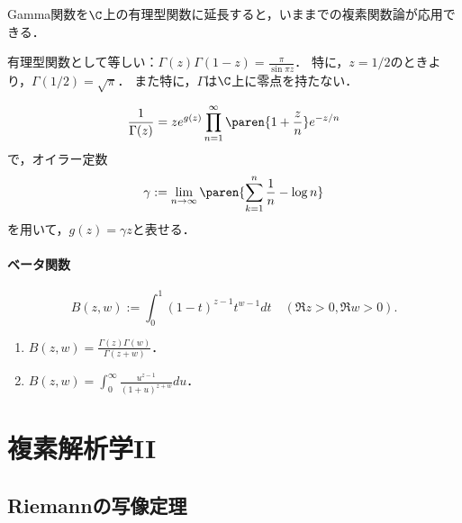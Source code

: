 \documentclass[uplatex, dvipdfmx]{jsreport}
\begin{document}
\begin{tcolorbox}[colframe=ForestGreen, colback=ForestGreen!10!white,breakable,colbacktitle=ForestGreen!40!white,coltitle=black,fonttitle=\bfseries\sffamily,
title=]
    Gamma関数を$\C$上の有理型関数に延長すると，いままでの複素関数論が応用できる．
\end{tcolorbox}

\begin{theorem}[Gamma関数の反転公式]
    有理型関数として等しい：$\Gamma(z)\Gamma(1-z)=\frac{\pi}{\sin\pi z}$．
    特に，$z=1/2$のときより，$\Gamma(1/2)=\sqrt{\pi}$．
    また特に，$\Gamma$は$\C$上に零点を持たない．
\end{theorem}

\begin{corollary}
    \[\frac{1}{\Gamma(z)}=ze^{g(z)}\prod^\infty_{n=1}\paren{1+\frac{z}{n}}e^{-z/n}\]
    で，オイラー定数
    \[\gamma:=\lim_{n\to\infty}\paren{\sum^n_{k=1}\frac{1}{n}-\log n}\]
    を用いて，$g(z)=\gamma z$と表せる．
\end{corollary}

\subsection{ベータ関数}

\begin{definition}
    \[B(z,w):=\int^1_0(1-t)^{z-1}t^{w-1}dt\quad(\Re z>0,\Re w>0).\]
\end{definition}

\begin{proposition}\mbox{}
    \begin{enumerate}
        \item $B(z,w)=\frac{\Gamma(z)\Gamma(w)}{\Gamma(z+w)}$．
        \item $B(z,w)=\int^\infty_0\frac{u^{z-1}}{(1+u)^{z+w}}du$．
    \end{enumerate}
\end{proposition}

\part{複素解析学II}

\chapter{Riemannの写像定理}
\end{document}
